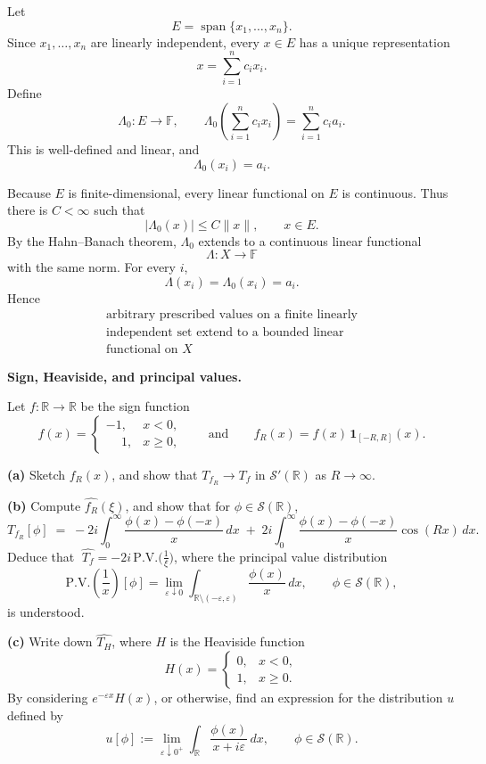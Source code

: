 \begin{solution}
Let
\[
E=\operatorname{span}\{x_1,\dots,x_n\}.
\]
Since \(x_1,\dots,x_n\) are linearly independent, every \(x\in E\) has a unique
representation
\[
x=\sum_{i=1}^n c_ix_i.
\]
Define
\[
\Lambda_0:E\to\mathbb F,
\qquad
\Lambda_0\!\left(\sum_{i=1}^n c_ix_i\right)
=
\sum_{i=1}^n c_i a_i.
\]
This is well-defined and linear, and
\[
\Lambda_0(x_i)=a_i.
\]

Because \(E\) is finite-dimensional, every linear functional on \(E\) is continuous.
Thus there is \(C<\infty\) such that
\[
|\Lambda_0(x)|\le C\|x\|,
\qquad x\in E.
\]
By the Hahn--Banach theorem, \(\Lambda_0\) extends to a continuous linear functional
\[
\Lambda:X\to\mathbb F
\]
with the same norm. For every \(i\),
\[
\Lambda(x_i)=\Lambda_0(x_i)=a_i.
\]
Hence
\[
\boxed{\begin{gathered}
\text{arbitrary prescribed values on a finite linearly}
\\
\text{independent set extend to a bounded linear}
\\
\text{functional on }X
\end{gathered}}
\]
\end{solution}

\begin{problem}[CP-II-0283]
\label{prob:cp-ii-0283}
\textbf{Sign, Heaviside, and principal values.}

\hspace*{1.5em}Let $f:\mathbb R\to\mathbb R$ be the sign function
\[
f(x)=
\begin{cases}
	-1,& x<0,\\
	\phantom{-}1,& x\ge 0,
\end{cases}
\qquad\text{and}\qquad
f_R(x)=f(x)\,\mathbf 1_{[-R,R]}(x).
\]

\noindent
\textbf{(a)} Sketch $f_R(x)$, and show that $T_{f_R}\to T_f$ in $\mathcal S'(\mathbb R)$ as $R\to\infty$.

\smallskip
\noindent
\textbf{(b)} Compute $\widehat{f_R}(\xi)$, and show that for $\phi\in\mathcal S(\mathbb R)$,
\[
T_{f_R}[\phi] \;=\; -2i\int_{0}^{\infty}\frac{\phi(x)-\phi(-x)}{x}\,dx
\;+\; 2i\int_{0}^{\infty}\frac{\phi(x)-\phi(-x)}{x}\cos(Rx)\,dx.
\]
Deduce that $\;\widehat{T_f}=-2i\,\mathrm{P.V.}\!\big(\frac{1}{\xi}\big)$, where the principal value distribution
\[
\mathrm{P.V.}\!\left(\frac{1}{x}\right)[\phi]
=\lim_{\varepsilon\downarrow 0}\int_{\mathbb R\setminus(-\varepsilon,\varepsilon)}\frac{\phi(x)}{x}\,dx,
\qquad \phi\in\mathcal S(\mathbb R),
\]
is understood.

\smallskip
\noindent
\textbf{(c)} Write down $\widehat{T_H}$, where $H$ is the Heaviside function
\[
H(x)=
\begin{cases}
	0,& x<0,\\
	1,& x\ge 0.
\end{cases}
\]
By considering $e^{-\varepsilon x}H(x)$, or otherwise, find an expression for the distribution $u$ defined by
\[
u[\phi]:=\lim_{\varepsilon\downarrow 0^+}\int_{\mathbb R}\frac{\phi(x)}{x+i\varepsilon}\,dx,
\qquad \phi\in\mathcal S(\mathbb R).
\]

\bigskip
\bigskip
\end{problem}

